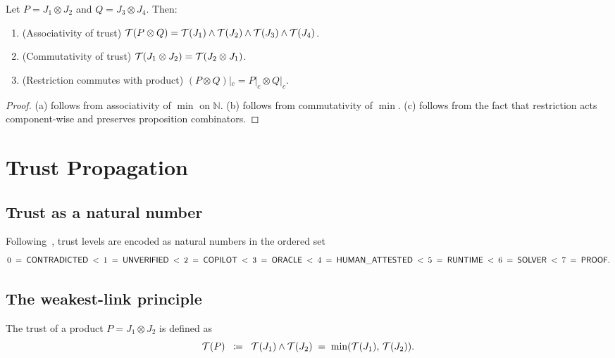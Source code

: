 \documentclass[11pt]{article}
\newcommand{\Jprod}{\mathbin{\otimes}}            %
\newcommand{\JprodN}[2]{#1 \Jprod #2}             %
\newcommand{\eqdef}{\;\coloneqq\;}                %
\begin{document}
\begin{proposition}\label{prop:alg-laws}
Let $P = \JprodN{J_1}{J_2}$ and $Q = \JprodN{J_3}{J_4}$.  Then:
\begin{enumerate}[label=(\alph*)]
  \item (Associativity of trust) $\trust(P \Jprod Q) = \trust(J_1) \wedge
        \trust(J_2) \wedge \trust(J_3) \wedge \trust(J_4)$.
  \item (Commutativity of trust) $\trust(\JprodN{J_1}{J_2}) =
        \trust(\JprodN{J_2}{J_1})$.
  \item (Restriction commutes with product) $(P \Jprod Q)|_c =
        P|_c \Jprod Q|_c$.
\end{enumerate}
\end{proposition}
\begin{proof}
(a) follows from associativity of $\min$ on $\mathbb{N}$.
(b) follows from commutativity of $\min$.
(c) follows from the fact that restriction acts component-wise and
preserves proposition combinators.
\end{proof}

\section{Trust Propagation}\label{sec:trust}

\subsection{Trust as a natural number}

Following~\cite{jugeo02,jugeo04}, trust levels are encoded as natural
numbers in the ordered set
\[
  0 \;=\; \mathsf{CONTRADICTED}
  \;<\; 1 \;=\; \mathsf{UNVERIFIED}
  \;<\; 2 \;=\; \mathsf{COPILOT}
  \;<\; 3 \;=\; \mathsf{ORACLE}
  \;<\; 4 \;=\; \mathsf{HUMAN\_ATTESTED}
  \;<\; 5 \;=\; \mathsf{RUNTIME}
  \;<\; 6 \;=\; \mathsf{SOLVER}
  \;<\; 7 \;=\; \mathsf{PROOF}.
\]

\subsection{The weakest-link principle}

\begin{definition}\label{def:prod-trust}
The trust of a product $P = \JprodN{J_1}{J_2}$ is defined as
\[
  \trust(P) \;\eqdef\; \trust(J_1) \wedge \trust(J_2)
                    \;=\; \min(\trust(J_1),\, \trust(J_2)).
\]
\end{definition}
\end{document}
